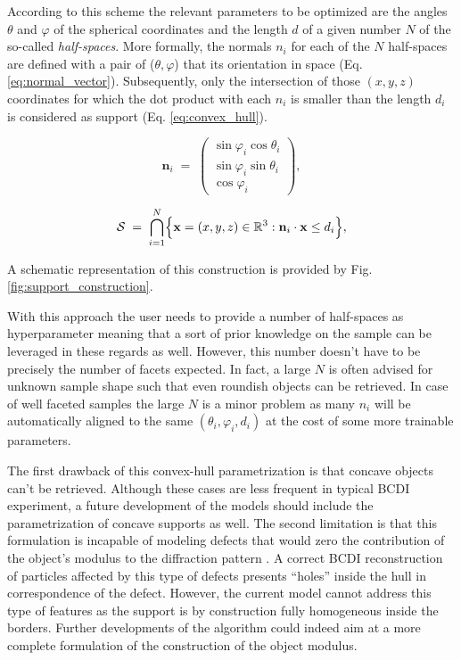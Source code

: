 According to this scheme the relevant parameters to be optimized are the angles $\theta$ and $ \varphi$ of the spherical 
coordinates and the length $d$ of a given number $N$ of the so-called \textit{half-spaces}. 
More formally, the normals $n_i$ for each of the $N$ half-spaces are defined with a pair of ($\theta , \varphi$) that  its
orientation in space (Eq. \ref{eq:normal_vector}). Subsequently, only the intersection of those $(x,y,z)$ coordinates for which the dot product with 
each $n_i$ is smaller than the length $d_i$ is considered as support (Eq. \ref{eq:convex_hull}).


\begin{equation}
    \mathbf n_i \;=\;
    \begin{pmatrix}
    \sin\varphi_i\cos\theta_i \\[6pt]
    \sin\varphi_i\sin\theta_i \\[6pt]
    \cos\varphi_i
    \end{pmatrix},
    \label{eq:normal_vector}
\end{equation}
    
\begin{equation}
    \mathcal S \;=\;
    \bigcap_{i=1}^N
    \Bigl\{\mathbf x=(x,y,z)\in\mathbb R^3 : 
    \mathbf n_i\cdot\mathbf x \le d_i\Bigr\},
    \label{eq:convex_hull}
\end{equation}

A schematic representation of this construction is provided by Fig. \ref{fig:support_construction}.
 
With this approach the user needs to provide a number of half-spaces as hyperparameter meaning that a sort of prior knowledge 
on the sample can be leveraged in these regards as well. However, this number doesn't have to be precisely the number of 
facets expected. In fact, a large $N$ is often advised for unknown sample shape such that even roundish objects can be 
retrieved. In case of well faceted samples the large $N$ is a minor problem as many $n_i$ will be automatically aligned to the 
same $(\theta_i, \varphi_i, d_i)$ at the cost of some more trainable parameters. 

The first drawback of this convex-hull parametrization is that concave objects can't be retrieved. Although these cases 
are less frequent in typical BCDI experiment, a future development of the models should include the parametrization of 
concave supports as well. The second limitation is that this formulation is incapable of modeling 
defects that would zero the contribution of the object's modulus to the diffraction pattern \cite{favre-nicolin_analysis_2010}. 
A correct BCDI reconstruction of particles affected by this type of defects presents ``holes'' inside the hull in correspondence 
of the defect. However, the current model cannot address this type of features as the support is by construction fully homogeneous 
inside the borders. Further developments of the algorithm could indeed aim at a more complete formulation of the construction 
of the object modulus. 

